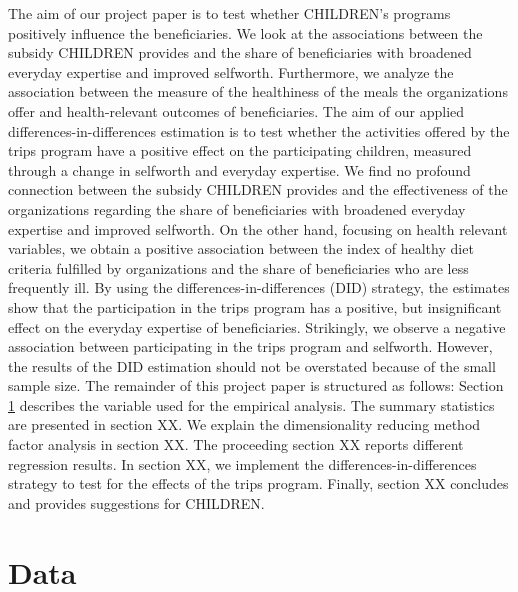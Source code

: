 \documentclass[12pt, a4paper, titlepage]{article}\usepackage[]{graphicx}\usepackage[]{color}
\begin{document}
The aim of our project paper is to test whether CHILDREN’s programs positively influence the beneficiaries. We look at the associations between the subsidy CHILDREN provides and the share of beneficiaries with broadened everyday expertise and improved selfworth. Furthermore, we analyze the association between the measure of the healthiness of the meals the organizations offer and health-relevant outcomes of beneficiaries. The aim of our applied differences-in-differences estimation is to test whether the activities offered by the trips program have a positive effect on the participating children, measured through a change in selfworth and everyday expertise.
We find no profound connection between the subsidy CHILDREN provides and the effectiveness of the organizations regarding the share of beneficiaries with broadened everyday expertise and improved selfworth. On the other hand, focusing on health relevant variables, we obtain a positive association between the index of healthy diet criteria fulfilled by organizations and the share of beneficiaries who are less frequently ill. By using the differences-in-differences (DID) strategy, the estimates show that the participation in the trips program has a positive, but insignificant effect on the everyday expertise of beneficiaries. Strikingly, we observe a negative association between participating in the trips program and selfworth. However, the results of the DID estimation should not be overstated because of the small sample size.
The remainder of this project paper is structured as follows: Section \ref{data} describes the variable used for the empirical analysis. The summary statistics are presented in section XX. We explain the dimensionality reducing method factor analysis in section XX. The proceeding section XX reports different regression results. In section XX, we implement the differences-in-differences strategy to test for the effects of the trips program. Finally, section XX concludes and provides suggestions for CHILDREN.

\section{Data}
\label{data}
\end{document}
